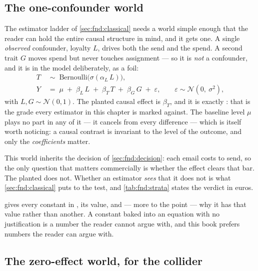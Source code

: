 


\subsection*{The one-confounder world}

The estimator ladder of \cref{sec:fnd:classical} needs a world simple enough that the reader
can hold the entire causal structure in mind, and it gets one. A single \emph{observed}
confounder, loyalty $L$, drives both the send and the spend. A second trait $G$ moves spend but
never touches assignment --- so it is \emph{not} a confounder, and it is in the model
deliberately, as a foil:
%
\begin{align}
  T &\;\sim\; \text{Bernoulli}\big(\sigma(\alpha_L\, L)\big), \label{eq:fnd:dag_t}\\
  Y &\;=\; \mu \;+\; \beta_L\, L \;+\; \beta_T\, T \;+\; \beta_G\, G \;+\; \varepsilon,
       \qquad \varepsilon \sim \mathcal N\!\left(0,\ \sigma^{2}\right),
  \label{eq:fnd:dag_y}
\end{align}
%
with $L, G \sim \mathcal N(0,1)$. The planted causal effect is $\beta_T$, and it is exactly
\eur{\nbZeroTrueDag}: that is the grade every estimator in this chapter is marked against. The
baseline level $\mu$ plays no part in any of it --- it cancels from every difference --- which
is itself worth noticing: a causal contrast is invariant to the level of the outcome, and only
the \emph{coefficients} matter.

This world inherits the decision of \cref{sec:fnd:decision}: each email costs \eur{\nbZeroCost}
to send, so the only question that matters commercially is whether the effect clears that bar.
The planted \eur{\nbZeroTrueDag} does not. Whether an estimator \emph{sees} that it does not is
what \cref{sec:fnd:classical} puts to the test, and \cref{tab:fnd:strata} states the verdict in
euros.

 gives every constant in
, its value, and --- more to the point --- why it has
that value rather than another. A constant baked into an equation with no justification is a
number the reader cannot argue with, and this book prefers numbers the reader can argue with.



\subsection*{The zero-effect world, for the collider}

